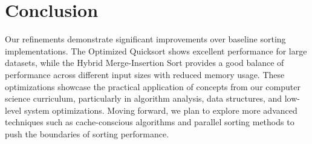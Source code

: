 \documentclass[twocolumn]{article}
\begin{document}
\section{Conclusion}
Our refinements demonstrate significant improvements over baseline sorting implementations. The Optimized Quicksort shows excellent performance for large datasets, while the Hybrid Merge-Insertion Sort provides a good balance of performance across different input sizes with reduced memory usage. These optimizations showcase the practical application of concepts from our computer science curriculum, particularly in algorithm analysis, data structures, and low-level system optimizations. Moving forward, we plan to explore more advanced techniques such as cache-conscious algorithms and parallel sorting methods to push the boundaries of sorting performance.
\end{document}
